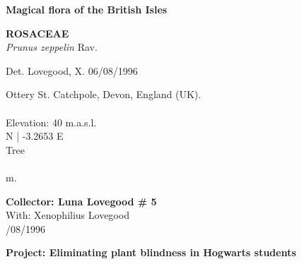 \documentclass[
]{article}
\begin{document}
\pagebreak
\begin{mdframed}[linewidth=2pt,linecolor=black, innerleftmargin = 1.5 cm, innerrightmargin = 1.5 cm]

\begin{center}
\bigskip
{\fontsize{30pt}{100pt}\selectfont\bf Magical flora of the British Isles } \\
\end{center}
\begin{flushright}
\begin{minipage}[c][20ex][c]{15em}  
\end{minipage}
\end{flushright}
\begin{flushleft}
{\fontsize{35pt}{100pt}\selectfont\bf ROSACEAE  } \\
\vfill
{\fontsize{35pt}{100pt}\selectfont\emph{ Prunus zeppelin }  Rav. } \\
\end{flushleft}
\begin{flushright}
{\fontsize{22.55pt}{100pt}\selectfont Det. Lovegood, X.   06/08/1996 } \\
\end{flushright}
\vfill
\bigskip
\bigskip
\begin{flushleft}
{\fontsize{25pt}{100pt}\selectfont Ottery St. Catchpole, Devon, England (UK). } \\
{\fontsize{25pt}{100pt}\selectfont ~ } \\
{\fontsize{25pt}{100pt}\selectfont Elevation: 40 m.a.s.l. }\\
{\fontsize{25pt}{100pt} N  |  -3.2653 E } \\
\vfill
{\fontsize{25pt}{100pt}\selectfont Tree } \\
{\fontsize{25pt}{100pt}\selectfont ~ } \\
{\fontsize{25pt}{100pt} m. } \\
\end{flushleft}
\vfill
\begin{flushright}
{\fontsize{20pt}{100pt}\selectfont\bf Collector:  Luna Lovegood  \# 5 } \\
{\fontsize{20pt}{100pt}\selectfont With:  Xenophilius Lovegood } \\
{\fontsize{20pt}{100pt}/08/1996 } \\
\end{flushright}
\vfill
\begin{center}
{\fontsize{25pt}{80pt}\selectfont\bf  Project: Eliminating plant blindness in Hogwarts students } \\
\end{center}
\end{mdframed}
\end{document}

